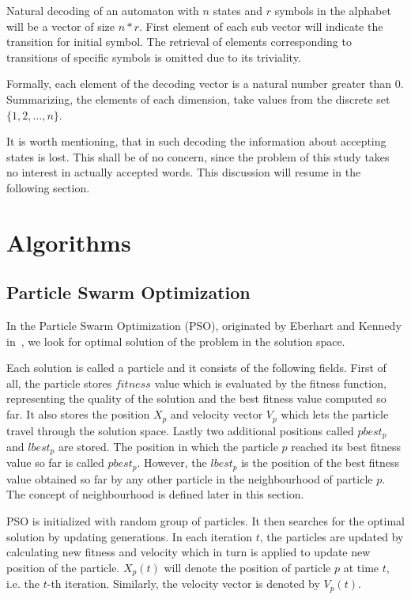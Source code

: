 \documentclass{article}
\begin{document}
Natural decoding of an automaton with $n$ states and $r$ symbols in the alphabet will be a vector of size $n*r$. First element of each sub vector will indicate the transition for initial symbol. The retrieval of elements corresponding to transitions of specific symbols is omitted due to its triviality.

Formally, each element of the decoding vector is a natural number greater than 0. Summarizing, the elements of each dimension, take values from the discrete set $\{1,2, \ldots, n\}$.

It is worth mentioning, that in such decoding the information about accepting states is lost. This shall be of no concern, since the problem of this study takes no interest in actually accepted words. This discussion will resume in the following section.





\section{Algorithms} \label{section:Algorithms}

\subsection{Particle Swarm Optimization}
In the Particle Swarm Optimization (PSO), originated by Eberhart and Kennedy in~\cite{pso_origin}, we look for optimal solution of the problem in the solution space. 

Each solution is called a particle and it consists of the following fields. First of all, the particle stores $fitness$ value which is evaluated by the fitness function, representing the quality of the solution and the best fitness value computed so far. It also stores the position $X_p$ and velocity vector $V_p$ which lets the particle travel through the solution space. Lastly two additional positions called $pbest_p$ and $lbest_p$ are stored. The position in which the particle $p$ reached its best fitness value so far is called $pbest_p$. However, the $lbest_p$ is the position of the best fitness value obtained so far by any other particle in the neighbourhood of particle $p$. The concept of neighbourhood is defined later in this section.

PSO is initialized with random group of particles. It then searches for the optimal solution by updating generations.
In each iteration $t$, the particles are updated by calculating new fitness and velocity which in turn is applied to update new position of the particle. $X_p(t)$ will denote the position of particle $p$ at time $t$, i.e. the $t$-th iteration. Similarly, the velocity vector is denoted by $V_p(t)$.
\end{document}
